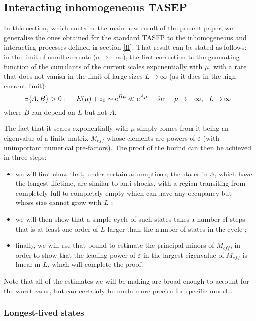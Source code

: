 \documentclass[aps,pre,onecolumn,showpacs,showkeys,a4paper]{revtex4-1}
\begin{document}
\subsection{Interacting inhomogeneous TASEP}
\label{IVc}

In this section, which contains the main new result of the present paper, we generalise the ones obtained for the standard TASEP to the inhomogeneous and interacting processes defined in section \ref{II}. That result can be stated as follows: in the limit of small currents ($\mu\rightarrow-\infty$), the first correction to the generating function of the cumulants of the current scales exponentially with $\mu$, with a rate that does not vanish in the limit of large sizes $L\rightarrow\infty$ (as it does in the high current limit):
\begin{equation}
\exists \{A,B\}>0: ~~~~ E(\mu)+z_0\sim{\rm e}^{B\mu}\ll {\rm e}^{A\mu}~~~~{\rm for}~~~~\mu\rightarrow -\infty,~~L\rightarrow\infty
\end{equation}
where $B$ can depend on $L$ but not $A$. 

The fact that it scales exponentially with $\mu$ simply comes from it being an eigenvalue of a finite matrix $M_{eff}$ whose elements are powers of $\varepsilon$ (with unimportant numerical pre-factors). The proof of the bound can then be achieved in three steps:
\begin{itemize}
\item we will first show that, under certain assumptions, the states in $\mathcal{S}$, which have the longest lifetime, are similar to anti-shocks, with a region transiting from completely full to completely empty which can have any occupancy but whose size cannot grow with $L$ ; 
\item we will then show that a simple cycle of such states takes a number of steps that is at least one order of $L$ larger than the number of states in the cycle ;
\item finally, we will use that bound to estimate the principal minors of $M_{eff}$, in order to show that the leading power of $\varepsilon$ in the largest eigenvalue of $M_{eff}$ is linear in $L$, which will complete the proof.
\end{itemize}
Note that all of the estimates we will be making are broad enough to account for the worst cases, but can certainly be made more precise for specific models.

\subsubsection{Longest-lived states}
\label{IVc1}
\end{document}

